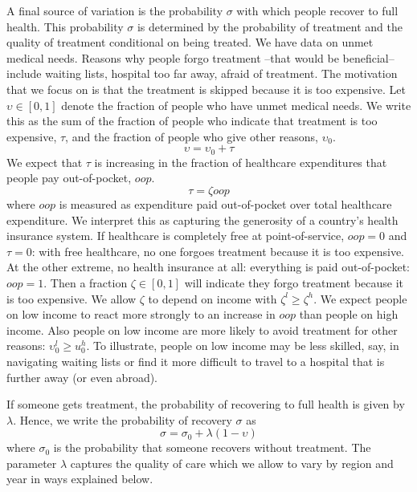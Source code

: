 \documentclass[a4paper,12pt]{article}
\begin{document}
A final source of variation is the probability \(\sigma\) with which people recover to full health. This probability \(\sigma\) is determined by the probability of treatment and the quality of treatment conditional on being treated. We have data on unmet medical needs. Reasons why people forgo treatment --that would be beneficial-- include waiting lists, hospital too far away, afraid of treatment. The motivation that we focus on is that the treatment is skipped because it is too expensive. Let \(\upsilon \in [0,1]\) denote the fraction of people who have unmet medical needs. We write this as the sum of the fraction of people who indicate that treatment is too expensive, \(\tau\), and the fraction of people who give other reasons, \(\upsilon_0\).
\begin{equation}
\label{eq:3}
\upsilon = \upsilon_0 + \tau
\end{equation}
We expect that \(\tau\) is increasing in the fraction of healthcare expenditures that people pay out-of-pocket, \(oop\).
\begin{equation}
\label{eq:4}
\tau = \zeta oop
\end{equation}
where \(oop\) is measured as expenditure paid out-of-pocket over total healthcare expenditure. We interpret this as capturing the generosity of a country's health insurance system. If healthcare is completely free at point-of-service, \(oop=0\) and \(\tau=0\): with free healthcare, no one forgoes treatment because it is too expensive. At the other extreme, no health insurance at all: everything is paid out-of-pocket: \(oop=1\). Then a fraction \(\zeta \in [0,1]\) will indicate they forgo treatment because it is too expensive. We allow \(\zeta\) to depend on income with \(\zeta^l \geq \zeta^h\). We expect people on low income to react more strongly to an increase in \(oop\) than people on high income. Also people on low income are more likely to avoid treatment for other reasons: \(\upsilon_0^l \geq u_0^h\). To illustrate, people on low income may be less skilled, say, in navigating waiting lists or find it more difficult to travel to a hospital that is further away (or even abroad).

If someone gets treatment, the probability of recovering to full health is given by \(\lambda\). Hence, we write the probability of recovery \(\sigma\) as
\begin{equation}
\label{eq:5}
\sigma = \sigma_0 + \lambda (1-\upsilon)
\end{equation}
where \(\sigma_0\) is the probability that someone recovers without treatment. The parameter \(\lambda\) captures the quality of care which we allow to vary by region and year in ways explained below.
\end{document}
